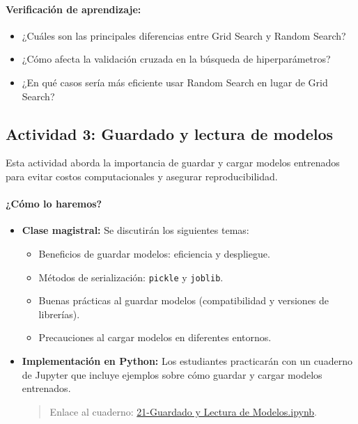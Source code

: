 \documentclass[a4,11pt]{aleph-notas}
\begin{document}
\paragraph{Verificación de aprendizaje:}  
\begin{itemize}[leftmargin=*]
    \item ¿Cuáles son las principales diferencias entre Grid Search y Random Search?
    \item ¿Cómo afecta la validación cruzada en la búsqueda de hiperparámetros?
    \item ¿En qué casos sería más eficiente usar Random Search en lugar de Grid Search?
\end{itemize}

\subsection*{Actividad 3: Guardado y lectura de modelos}

Esta actividad aborda la importancia de guardar y cargar modelos entrenados para evitar costos computacionales y asegurar reproducibilidad. 

\paragraph{¿Cómo lo haremos?}  
\begin{itemize}[leftmargin=*]
    \item \textbf{Clase magistral:} Se discutirán los siguientes temas:
    \begin{itemize}
        \item Beneficios de guardar modelos: eficiencia y despliegue.
        \item Métodos de serialización: \texttt{pickle} y \texttt{joblib}.
        \item Buenas prácticas al guardar modelos (compatibilidad y versiones de librerías).
        \item Precauciones al cargar modelos en diferentes entornos.
    \end{itemize}
    \item \textbf{Implementación en Python:} Los estudiantes practicarán con un cuaderno de Jupyter que incluye ejemplos sobre cómo guardar y cargar modelos entrenados.
    \begin{quote}
        Enlace al cuaderno: \href{https://colab.research.google.com/github/andres-merino/AprendizajeAutomaticoInicial-05-N0105/blob/main/2-Notebooks/21-Guardado-Lectura-Modelos.ipynb}{21-Guardado y Lectura de Modelos.ipynb}.
    \end{quote}
\end{itemize}
\end{document}

